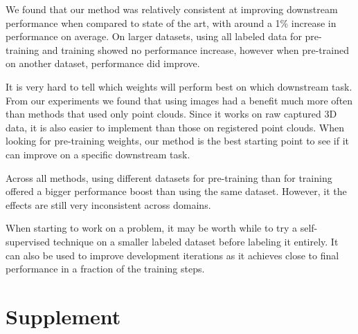 \documentclass[10pt,twocolumn,letterpaper]{article}
\begin{document}
We found that our method was relatively consistent at improving downstream performance when compared to state of the art, with around a 1\% increase in performance on average. On larger datasets, using all labeled data for pre-training and training showed no performance increase, however when pre-trained on another dataset, performance did improve.

It is very hard to tell which weights will perform best on which downstream task. From our experiments we found that using images had a benefit much more often than methods that used only point clouds. Since it works on raw captured 3D data, it is also easier to implement than those on registered point clouds. When looking for pre-training weights, our method is the best starting point to see if it can improve on a specific downstream task.

Across all methods, using different datasets for pre-training than for training offered a bigger performance boost than using the same dataset. However, it the effects are still very inconsistent across domains.

When starting to work on a problem, it may be worth while to try a self-supervised technique on a smaller labeled dataset before labeling it entirely. It can also be used to improve development iterations as it achieves close to final performance in a fraction of the training steps.

\clearpage
{\small
    
    
}

\clearpage
\section{Supplement}
\end{document}
